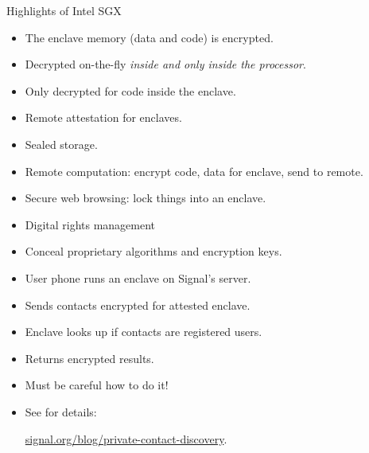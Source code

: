 \begin{frame}
  \begin{block}{Highlights of Intel SGX}
    \begin{itemize}
      \item The enclave memory (data and code) is encrypted.
      \item Decrypted on-the-fly \emph{inside and only inside the processor}.
      \item Only decrypted for code inside the enclave.
      \item Remote attestation for enclaves.
      \item Sealed storage.
    \end{itemize}
  \end{block}
\end{frame}

\begin{frame}
  \begin{example}[Uses]
    \begin{itemize}
      \item Remote computation: encrypt code, data for enclave, send to remote.
      \item Secure web browsing: lock things into an enclave.
      \item Digital rights management
      \item Conceal proprietary algorithms and encryption keys.
    \end{itemize}
  \end{example}
\end{frame}

\begin{frame}
  \begin{example}
    \begin{itemize}
      \item User phone runs an enclave on Signal's server.
      \item Sends contacts encrypted for attested enclave.
      \item Enclave looks up if contacts are registered users.
      \item Returns encrypted results.
    \end{itemize}
  \end{example}

  \pause

  \begin{remark}
    \begin{itemize}
      \item Must be careful how to do it!
      \item See \cite{SignalSGXContactDiscovery} for details:
        \begin{center}
          \href{https://signal.org/blog/private-contact-discovery/}
            {signal.org/blog/private-contact-discovery}.
        \end{center}
    \end{itemize}
  \end{remark}
\end{frame}

